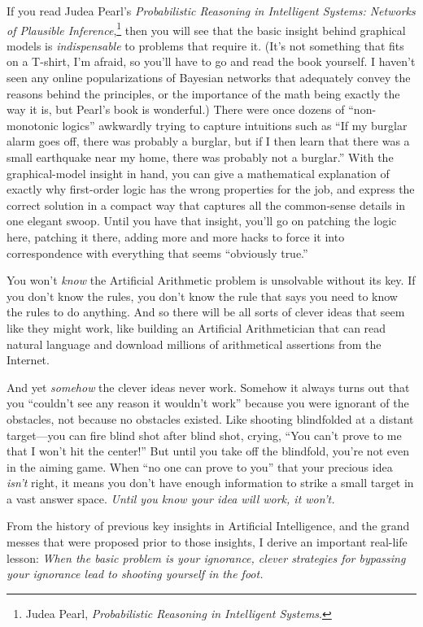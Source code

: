 {{
 If you read Judea Pearl's \textit{Probabilistic
Reasoning in Intelligent Systems: Networks of Plausible
Inference},\footnote{Judea Pearl, \textit{Probabilistic Reasoning in Intelligent
Systems}.} then you will see that the basic insight
behind graphical models is \textit{indispensable} to problems that
require it. (It's not something that fits on a T-shirt,
I'm afraid, so you'll have to go and
read the book yourself. I haven't seen any online
popularizations of Bayesian networks that adequately convey the reasons
behind the principles, or the importance of the math being exactly the
way it is, but Pearl's book is wonderful.) There were
once dozens of ``non-monotonic
logics'' awkwardly trying to capture intuitions such
as ``If my burglar alarm goes off, there was probably
a burglar, but if I then learn that there was a small earthquake near
my home, there was probably not a burglar.'' With the
graphical-model insight in hand, you can give a mathematical
explanation of exactly why first-order logic has the wrong properties
for the job, and express the correct solution in a compact way that
captures all the common-sense details in one elegant swoop. Until you
have that insight, you'll go on patching the logic
here, patching it there, adding more and more hacks to force it into
correspondence with everything that seems ``obviously
true.''}

{
 You won't \textit{know} the Artificial Arithmetic
problem is unsolvable without its key. If you don't
know the rules, you don't know the rule that says you
need to know the rules to do anything. And so there will be all sorts
of clever ideas that seem like they might work, like building an
Artificial Arithmetician that can read natural language and download
millions of arithmetical assertions from the Internet.}

{
 And yet \textit{somehow} the clever ideas never work. Somehow it
always turns out that you ``couldn't
see any reason it wouldn't work''
because you were ignorant of the obstacles, not because no obstacles
existed. Like shooting blindfolded at a distant target---you can fire
blind shot after blind shot, crying, ``You
can't prove to me that I won't hit the
center!'' But until you take off the blindfold,
you're not even in the aiming game. When
``no one can prove to you'' that
your precious idea \textit{isn't} right, it means you
don't have enough information to strike a small target
in a vast answer space. \textit{Until you know your idea will work, it
won't.}}

{
 From the history of previous key insights in Artificial
Intelligence, and the grand messes that were proposed prior to those
insights, I derive an important real-life lesson: \textit{When the
basic problem is your ignorance, clever strategies for bypassing your
ignorance lead to shooting yourself in the foot.}}

}
